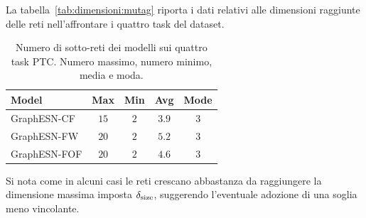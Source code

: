 La tabella~\ref{tab:dimensioni:mutag} riporta i dati relativi alle dimensioni raggiunte delle reti nell'affrontare i quattro task del dataset.
\begin{table}
\small
\caption[Dimensioni delle reti su PTC]{Numero di sotto-reti dei modelli sui quattro task PTC. Numero massimo, numero minimo, media e moda.}
\label{tab:dimensioni:ptc} 
\centering	
\begin{tabular}{l*{4}{c}}
\toprule
Model 		 & Max & Min & Avg & Mode \\
\midrule
GraphESN-CF  & $15$ & $2$ & $3.9$ & $3$ \\
GraphESN-FW  & $20$ & $2$ & $5.2$ & $3$ \\
GraphESN-FOF & $20$ & $2$ & $4.6$ & $3$ \\
\bottomrule
\end{tabular}
\end{table}
Si nota come in alcuni casi le reti crescano abbastanza da raggiungere la dimensione massima imposta $\delta_\textup{size}$, suggerendo l'eventuale adozione di una soglia meno vincolante.

